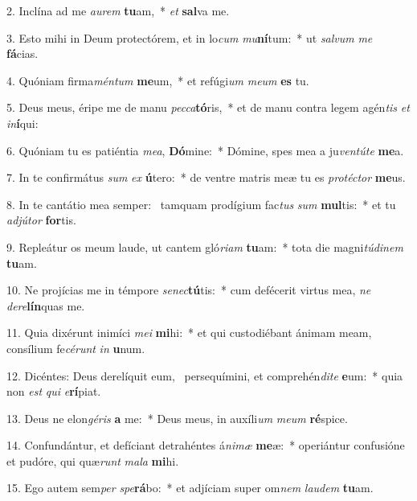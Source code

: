 2. Inclína ad me \textit{au}\textit{rem} \textbf{tu}am,~*  \textit{et} \textbf{sal}va me.\

3. Esto mihi in Deum protectórem, et in lo\textit{cum} \textit{mu}\textbf{ní}tum:~*  ut \textit{sal}\textit{vum} \textit{me} \textbf{fá}cias.\

4. Quóniam firma\textit{mén}\textit{tum} \textbf{me}um,~*  et refúgi\textit{um} \textit{me}\textit{um} \textbf{es} tu.\

5. Deus meus, éripe me de manu \textit{pec}\textit{ca}\textbf{tó}ris,~*  et de manu contra legem agén\textit{tis} \textit{et} \textit{in}\textbf{í}qui:\

6. Quóniam tu es patiéntia \textit{me}\textit{a}, \textbf{Dó}mine:~*  Dómine, spes mea a ju\textit{ven}\textit{tú}\textit{te} \textbf{me}a.\

7. In te confirmátus \textit{sum} \textit{ex} \textbf{ú}tero:~*  de ventre matris meæ tu es \textit{pro}\textit{téc}\textit{tor} \textbf{me}us.\

8. In te cantátio mea semper: \dag\  tamquam prodígium fac\textit{tus} \textit{sum} \textbf{mul}tis:~*  et tu \textit{ad}\textit{jú}\textit{tor} \textbf{for}tis.\

9. Repleátur os meum laude, ut cantem gló\textit{ri}\textit{am} \textbf{tu}am:~*  tota die magni\textit{tú}\textit{di}\textit{nem} \textbf{tu}am.\

10. Ne projícias me in témpore \textit{se}\textit{nec}\textbf{tú}tis:~*  cum defécerit virtus mea, \textit{ne} \textit{de}\textit{re}\textbf{lín}quas me.\

11. Quia dixérunt inimíci \textit{me}\textit{i} \textbf{mi}hi:~*  et qui custodiébant ánimam meam, consílium fe\textit{cé}\textit{runt} \textit{in} \textbf{u}num.\

12. Dicéntes: Deus derelíquit eum, \dag\  persequímini, et comprehén\textit{di}\textit{te} \textbf{e}um:~*  quia non \textit{est} \textit{qui} \textit{e}\textbf{rí}piat.\

13. Deus ne elon\textit{gé}\textit{ris} \textbf{a} me:~*  Deus meus, in auxíli\textit{um} \textit{me}\textit{um} \textbf{ré}spice.\

14. Confundántur, et defíciant detrahéntes á\textit{ni}\textit{mæ} \textbf{me}æ:~*  operiántur confusióne et pudóre, qui quæ\textit{runt} \textit{ma}\textit{la} \textbf{mi}hi.\

15. Ego autem sem\textit{per} \textit{spe}\textbf{rá}bo:~*  et adjíciam super om\textit{nem} \textit{lau}\textit{dem} \textbf{tu}am.\

